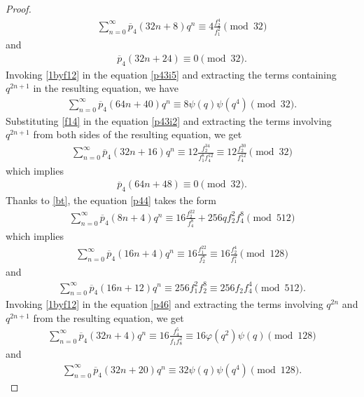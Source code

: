 \documentclass[11pt, reqno]{amsart}
\numberwithin{equation}{section}
\begin{document}
\begin{proof}
		\begin{align}
			\sum_{n=0}^{\infty}\overline{p}_{4}(32n+8)q^n\equiv4\frac{f_{2}^{4}}{f_1^{2}}\pmod{32}\label{p43i5}
		\end{align}
		and 
		\begin{align}
			\overline{p}_{4}(32n+24)\equiv0\pmod{32}.\label{p43i510}
		\end{align}
		Invoking \eqref{1byf12} in the equation \eqref{p43i5} and extracting the terms containing $q^{2n+1}$ in the resulting equation, we have
		\begin{align}
			\sum_{n=0}^{\infty}\overline{p}_{4}(64n+40)q^n\equiv8\psi(q)\psi(q^4)\pmod{32}.\label{p43i6}
		\end{align}
		Substituting \eqref{f14} in the equation \eqref{p43i2} and extracting the terms involving $q^{2n+1}$ from both sides of the resulting equation, we get
		\begin{align}
			\sum_{n=0}^{\infty}\overline{p}_{4}(32n+16)q^n\equiv12\frac{f_2^{34}}{f_1^{8}f_{4}^{12}}\equiv12\frac{f_2^{30}}{f_{4}^{12}} \pmod{32}\label{p43i3}
		\end{align}
		which implies 
		\begin{align}
			\overline{p}_{4}(64n+48)\equiv0 \pmod{32}.\label{p43i31}
		\end{align}
		Thanks to \eqref{bt}, the equation \eqref{p44} takes the form
		\begin{align}
			\sum_{n=0}^{\infty}\overline{p}_{4}(8n+4)q^n\equiv16\frac{f_2^{22}}{f_{4}^{8}}+256qf_2^2f_4^8\pmod{512}\label{p45}
		\end{align}
		which implies
		\begin{align}
			\sum_{n=0}^{\infty}\overline{p}_{4}(16n+4)q^n\equiv16\frac{f_1^{22}}{f_{2}^{8}}\equiv16\frac{f_2^4}{f_1^2}\pmod{128}\label{p46}
		\end{align}
		and
		\begin{align}
			\sum_{n=0}^{\infty}\overline{p}_{4}(16n+12)q^n\equiv256f_1^2f_2^8\equiv 256f_2f_4^4\pmod{512}.\label{p47}
		\end{align}
		Invoking \eqref{1byf12} in the equation \eqref{p46} and extracting the terms involving $q^{2n}$ and $q^{2n+1}$ from the resulting equation, we get
		\begin{align}
			\sum_{n=0}^{\infty}\overline{p}_{4}(32n+4)q^n\equiv16\frac{f_4^{5}}{f_{1}f_{8}^2}\equiv16\varphi(q^2)\psi(q)\pmod{128}\label{p48}
		\end{align}
		and
		\begin{align}
			\sum_{n=0}^{\infty}\overline{p}_{4}(32n+20)q^n\equiv32\psi(q)\psi(q^4)\pmod{128}.\label{p49}

\end{align}
\end{proof}
\end{document}
